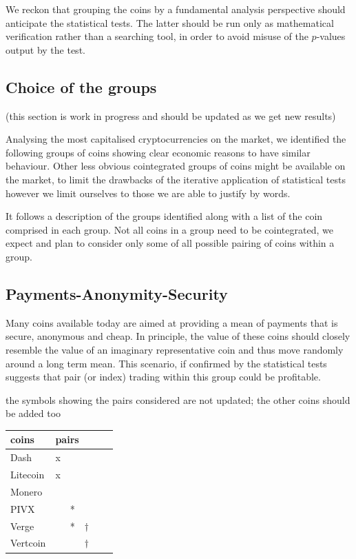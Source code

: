 \documentclass[a4paper,11pt]{article}
\theoremstyle{remark}
\theoremstyle{plain}
\newcommand\ab[1]{{\color{blue} #1 }}
\begin{document}
We reckon that grouping the coins by a fundamental analysis perspective should anticipate the statistical tests. The latter should be run only as mathematical verification rather than a searching tool, in order to avoid misuse of the $p$-values output by the test.

\subsection{Choice of the groups}

\ab{(this section is work in progress and should be updated as we get new results)}

Analysing the most capitalised cryptocurrencies on the market, we identified the following groups of coins showing clear economic reasons to have similar behaviour. Other less obvious cointegrated groups of coins might be available on the market, to limit the drawbacks of the iterative application of statistical tests however we limit ourselves to those we are able to justify by words.

It follows a description of the groups identified along with a list of the coin comprised in each group. Not all coins in a group need to be cointegrated, we expect and plan to consider only some of all possible pairing of coins within a group. 

\subsection{Payments-Anonymity-Security}
Many coins available today are aimed at providing a mean of payments that is secure, anonymous and cheap. In principle, the value of these coins should closely resemble the value of an imaginary representative coin and thus move randomly around a long term mean. This scenario, if confirmed by the statistical tests suggests that pair (or index) trading within this group could be profitable. 

\ab{the symbols showing the pairs considered are not updated; the other coins should be added too}

\begin{table}[h]
\centering
\begin{tabular}{l|lllll}
coins & \multicolumn{5}{l}{pairs} \\ \hline \hline
 Dash    &   x  &     &     &     &    \\  \hline
 Litecoin    &  x   &     &     &     &    \\  \hline
  Monero    &     &     &     &     &    \\  \hline
  PIVX   &     &    * &     &     &    \\  \hline
 Verge    &     &  *   &  $\dagger$   &     &    \\ \hline
 Vertcoin    &     &     &  $\dagger$   &     &    
\end{tabular}
\end{table}
\end{document}
